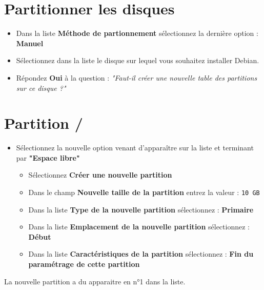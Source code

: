 \section{Partitionner les disques}
\begin{itemize}
	\item Dans la liste \textbf{Méthode de partionnement} sélectionnez la dernière option : \textbf{Manuel}
	\item Sélectionnez dans la liste le disque sur lequel vous souhaitez installer Debian.
	\item Répondez \textbf{Oui} à la question : \textit{"Faut-il créer une nouvelle table des partitions sur ce disque ?"}
\end{itemize}

\section{Partition /}
	\begin{itemize}
	\item Sélectionnez la nouvelle option venant d'apparaître sur la liste et terminant par \textbf{"Espace libre"}
		\begin{itemize}
			\item Sélectionnez \textbf{Créer une nouvelle partition}
			\item Dans le champ \textbf{Nouvelle taille de la partition} entrez la valeur : \texttt{10 GB}
			\item Dans la liste \textbf{Type de la nouvelle partition} sélectionnez : \textbf{Primaire}
			\item Dans la liste \textbf{Emplacement de la nouvelle partition} sélectionnez : \textbf{Début}
			\item Dans la liste \textbf{Caractéristiques de la partition} sélectionnez : \textbf{Fin du paramétrage de cette partition}\\	
		\end{itemize}
	\end{itemize}
La nouvelle partition a du apparaitre en n°1 dans la liste.
		
